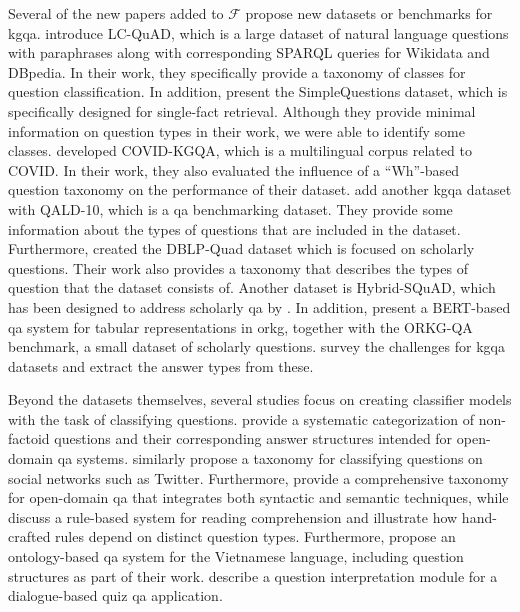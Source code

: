 Several of the new papers added to $\mathcal{F}$ propose new datasets or benchmarks for \gls{kgqa}. \textcite{dubey_lc-quad_2019} introduce LC-QuAD, which is a large dataset of natural language questions with paraphrases along with corresponding SPARQL queries for Wikidata and DBpedia. In their work, they specifically provide a taxonomy of classes for question classification. In addition, \textcite{bordes_large-scale_2015} present the SimpleQuestions dataset, which is specifically designed for single-fact retrieval. Although they provide minimal information on question types in their work, we were able to identify some classes. \textcite{tran_comparative_2022} developed COVID-KGQA, which is a multilingual corpus related to COVID. In their work, they also evaluated the influence of a \enquote{Wh}-based question taxonomy on the performance of their dataset. \textcite{usbeck_qald-10_2023} add another \gls{kgqa} dataset with QALD-10, which is a \gls{qa} benchmarking dataset. They provide some information about the types of questions that are included in the dataset. Furthermore, \textcite{banerjee_dblp-quad_2023} created the DBLP-Quad dataset which is focused on scholarly questions. Their work also provides a taxonomy that describes the types of question that the dataset consists of. Another dataset is Hybrid-SQuAD, which has been designed to address scholarly \gls{qa} by \textcite{taffa_hybrid-squad_2024}. In addition, \textcite{jaradeh_question_2020} present a BERT-based \gls{qa} system for tabular representations in \gls{orkg}, together with the ORKG-QA benchmark, a small dataset of scholarly questions. \textcite{steinmetz_what_2021} survey the challenges for \gls{kgqa} datasets and extract the answer types from these.

Beyond the datasets themselves, several studies focus on creating classifier models with the task of classifying questions. \textcite{bolotova_non-factoid_2022} provide a systematic categorization of non-factoid questions and their corresponding answer structures intended for open-domain \gls{qa} systems. \textcite{liu_taxonomy_2015} similarly propose a taxonomy for classifying questions on social networks such as Twitter. Furthermore, \textcite{moldovan_structure_2000} provide a comprehensive taxonomy for open-domain \gls{qa} that integrates both syntactic and semantic techniques, while \textcite{riloff_rule-based_2000} discuss a rule-based system for reading comprehension and illustrate how hand-crafted rules depend on distinct question types. Furthermore, \textcite{nguyen_ripple_2017} propose an ontology-based \gls{qa} system for the Vietnamese language, including question structures as part of their work. \textcite{chernov_linguistically_2015} describe a question interpretation module for a dialogue-based quiz \gls{qa} application.

